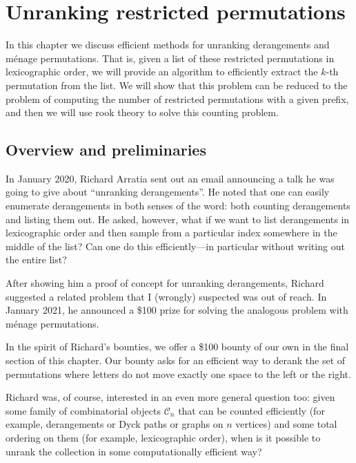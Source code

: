 \chapter{Unranking restricted permutations}
\label{cha:UnrankingMenage}

In this chapter we discuss efficient methods for unranking derangements and
m\'enage permutations.
That is, given a list of these restricted permutations in lexicographic order,
we will provide an algorithm to efficiently extract the $k$-th permutation from
the list.
We will show that this problem can be reduced to the problem of computing the
number of restricted permutations with a given prefix, and then we will
use rook theory to solve this counting problem.

\section{Overview and preliminaries}
In January 2020, Richard Arratia sent out an email announcing a talk he was
going to give about ``unranking derangements''.
He noted that one can easily enumerate derangements in both senses of the word:
both counting derangements and listing them out. He asked, however, what if
we want to list derangements in lexicographic order and then sample from a
particular index somewhere in the middle of the list? Can one do this
efficiently---in particular without writing out the entire list?

After showing him a proof of concept for unranking derangements, Richard
suggested a related problem that I (wrongly) suspected was out of reach.
In January 2021, he announced a \$100 prize for solving the analogous problem
with m\'enage permutations.

In the spirit of Richard's bounties, we offer a \$100 bounty of our own in the
final section of this chapter. Our bounty asks for an efficient way to
derank the set of permutations where letters do not move exactly one space to
the left or the right.

Richard was, of course, interested in an even more general question too:
given some family of combinatorial objects $\mathcal{C}_n$ that can be counted
efficiently (for example, derangements or Dyck paths or graphs on $n$ vertices)
and some total ordering on them (for example, lexicographic order),
when is it possible to unrank the collection in some computationally
efficient way?

